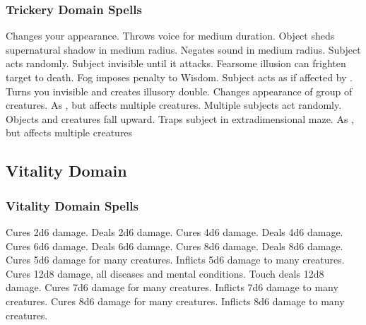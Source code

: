 \subsubsection{Trickery Domain Spells}
\begin{spelllist}
   Changes your appearance.
   Throws voice for medium duration.
   Object sheds supernatural shadow in medium radius.
   Negates sound in medium radius.
   Subject acts randomly.
   Subject invisible until it attacks.
  \spellhead[4]{}
   Fearsome illusion can frighten target to death.
   Fog imposes  penalty to Wisdom.
   Subject acts as if affected by .
   Turns you invisible and creates illusory double.
   Changes appearance of group of creatures.
   As , but affects multiple creatures.
   Multiple subjects act randomly.
  \spellhead[8]{}
   Objects and creatures fall upward.
   Traps subject in extradimensional maze.
   As , but affects multiple creatures
\end{spelllist}

\subsection{Vitality Domain}
\subsubsection{Vitality Domain Spells}
\begin{spelllist}
   Cures 2d6 damage.
   Deals 2d6 damage.
   Cures 4d6 damage.
   Deals 4d6 damage.
   Cures 6d6 damage.
   Deals 6d6 damage.
   Cures 8d6 damage.
   Deals 8d6 damage.
   Cures 5d6 damage for many creatures.
   Inflicts 5d6 damage to many creatures.
   Cures 12d8 damage, all diseases and mental conditions.
   Touch deals 12d8 damage.
   Cures 7d6 damage for many creatures.
   Inflicts 7d6 damage to many creatures.
   Cures 8d6 damage for many creatures.
   Inflicts 8d6 damage to many creatures.
  \spellhead[9]{}
  \spellhead[9]{}
\end{spelllist}

